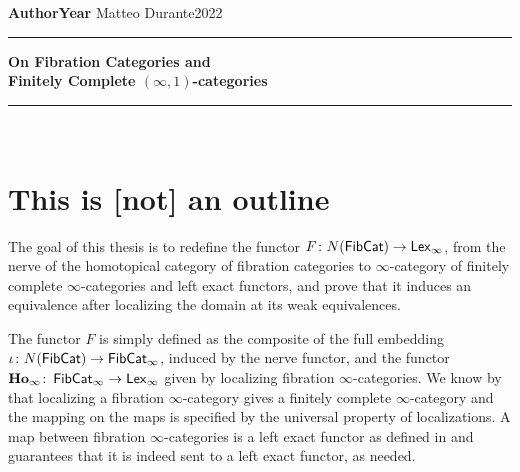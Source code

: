 \documentclass[a4paper,12pt,openany]{scrartcl}
\begin{document}
\noindent\textbf{Author}\hfill\textbf{Year} \linebreak
\vspace*{-.1cm} Matteo Durante\hfill 2022 \\

\noindent
\rule{\linewidth}{1pt}
\begin{center}
\Large
    \textbf{On Fibration Categories and\\ Finitely Complete $(\infty,1)$-categories} \\
\end{center}
\rule{\linewidth}{1pt}
\\


\newcommand{\La}{\Lambda}
\newcommand{\pa}{c}
\newcommand{\ob}{\operatorname{Ob}}
\newcommand{\mor}{\operatorname{Mor}}
\newcommand{\sto}{\twoheadrightarrow}

\newcommand{\plim}{\varprojlim}
\newcommand{\sst}{\subseteq}
\newcommand{\eq}{\operatorname{eq}}

\newcommand{\f}{\varphi}

\newcommand{\sing}{\operatorname{Sing}}

\newcommand{\ihom}{\underline{\Hom}}

\section{This is [not] an outline}

The goal of this thesis is to redefine the functor $F\colon
N(\operatorname{\mathsf{FibCat}})\rightarrow\operatorname{\mathsf{Lex}_\infty}$, from the nerve of the homotopical category of
fibration categories to $\infty$-category of finitely complete
$\infty$-categories and left exact functors, and prove that it induces an
equivalence after localizing the domain at its weak equivalences.

The functor $F$ is simply defined as the composite of the full embedding
$\iota\colon N(\operatorname{\mathsf{FibCat}})\rightarrow \operatorname{\mathsf{FibCat}}_\infty$, induced by the nerve
functor,  and the functor $\operatorname{\mathbf{Ho}_\infty}\colon
\operatorname{\mathsf{FibCat}}_\infty\rightarrow\operatorname{\mathsf{Lex}_\infty}$ given by localizing fibration
$\infty$-categories. We know by \cite[Thm.\ 7.5.6]{Cis19} that localizing a
fibration $\infty$-category gives a finitely complete $\infty$-category and the
mapping on the maps is specified by the universal property of localizations.
A map between fibration $\infty$-categories is a left exact functor as defined
in \cite[Def.\ 7.5.2]{Cis19} and \cite[Thm.\ 7.5.28]{Cis19} guarantees that it
is indeed sent to a left exact functor, as needed.
\end{document}
